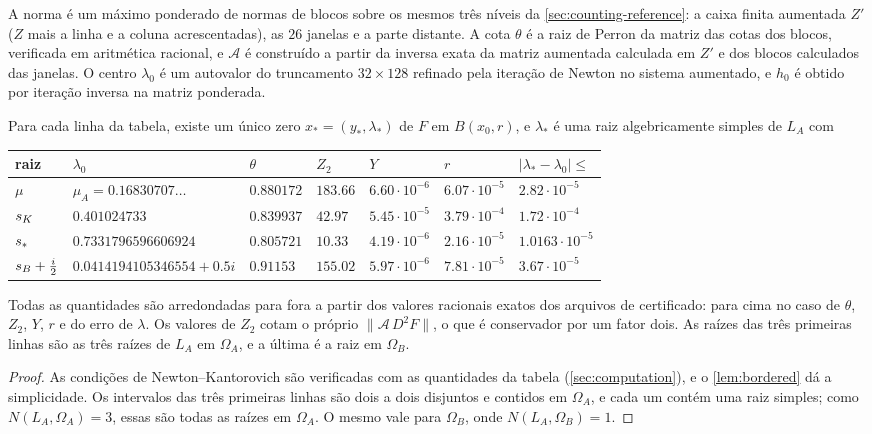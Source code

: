 A norma é um máximo ponderado de normas de blocos sobre os mesmos três níveis da \cref{sec:counting-reference}:
a caixa finita aumentada $Z'$ ($Z$ mais a linha e a coluna acrescentadas), as $26$ janelas e a parte distante. A
cota $\theta$ é a raiz de Perron da matriz das cotas dos blocos, verificada em aritmética racional, e $\mathcal A$
é construído a partir da inversa exata da matriz aumentada calculada em $Z'$ e dos blocos calculados das janelas. O
centro $\lambda_0$ é um autovalor do truncamento $32\times128$ refinado pela iteração de Newton no sistema aumentado, e
$h_0$ é obtido por iteração inversa na matriz ponderada.

\begin{proposition}\label{prop:nk}
Para cada linha da tabela, existe um único zero $x_*=(y_*,\lambda_*)$ de $F$ em $B(x_0,r)$, e $\lambda_*$ é uma
raiz algebricamente simples de $L_A$ com
\begin{center}
\begin{tabular}{@{}lllllll@{}}
\toprule
raiz & $\lambda_0$ & $\theta$ & $Z_2$ & $Y$ & $r$ & $|\lambda_*-\lambda_0|\le$ \\
\midrule
$\mu$ & $\mu_A=0.16830707\ldots$ & $0.880172$ & $183.66$ & $6.60\cdot10^{-6}$ & $6.07\cdot10^{-5}$ & $2.82\cdot10^{-5}$ \\
$s_{K}$ & $0.401024733$ & $0.839937$ & $42.97$ & $5.45\cdot10^{-5}$ & $3.79\cdot10^{-4}$ & $1.72\cdot10^{-4}$ \\
$s_{\ast}$ & $0.7331796596606924$ & $0.805721$ & $10.33$ & $4.19\cdot10^{-6}$ & $2.16\cdot10^{-5}$ & $1.0163\cdot10^{-5}$ \\
$s_{B}+\frac i2$ & $0.0414194105346554+0.5i$ & $0.91153$ & $155.02$ & $5.97\cdot10^{-6}$ & $7.81\cdot10^{-5}$ & $3.67\cdot10^{-5}$ \\
\bottomrule
\end{tabular}
\end{center}
Todas as quantidades são arredondadas para fora a partir dos valores racionais exatos dos arquivos de certificado: para cima no caso de $\theta$,
$Z_2$, $Y$, $r$ e do erro de $\lambda$. Os valores de $Z_2$ cotam o próprio $\|\mathcal A\,D^2F\|$, o que é
conservador por um fator dois. As raízes das três primeiras linhas são as três raízes de $L_A$ em $\Omega_A$, e a última é a raiz em
$\Omega_B$.
\end{proposition}

\begin{proof}
As condições de Newton--Kantorovich são verificadas com as quantidades da tabela (\cref{sec:computation}), e o
\cref{lem:bordered} dá a simplicidade. Os intervalos das três primeiras linhas são dois a dois disjuntos e contidos
em $\Omega_A$, e cada um contém uma raiz simples; como $N(L_A,\Omega_A)=3$, essas são todas as raízes em $\Omega_A$.
O mesmo vale para $\Omega_B$, onde $N(L_A,\Omega_B)=1$.
\end{proof}

